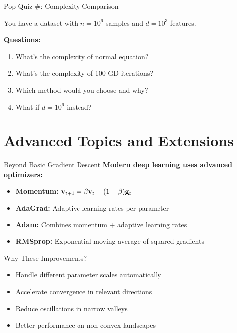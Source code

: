 \documentclass[usenames,dvipsnames]{beamer}
\begin{document}
  \begin{frame}{Pop Quiz \#\thepopquiz: Complexity Comparison}
    \begin{popquizbox}{\thepopquiz}
    You have a dataset with $n = 10^6$ samples and $d = 10^3$ features.
    
    \textbf{Questions:}
    \begin{enumerate}
        \item What's the complexity of normal equation?
        \item What's the complexity of 100 GD iterations?
        \item Which method would you choose and why?
        \item What if $d = 10^6$ instead?
    \end{enumerate}
    \end{popquizbox}
  \end{frame}

  \section{Advanced Topics and Extensions}

  \begin{frame}{Beyond Basic Gradient Descent}
    \textbf{Modern deep learning uses advanced optimizers:}
    
    \begin{itemize}[<+->]
        \item \textbf{Momentum:} $\mathbf{v}_{t+1} = \beta \mathbf{v}_t + (1-\beta)\mathbf{g}_t$
        \item \textbf{AdaGrad:} Adaptive learning rates per parameter
        \item \textbf{Adam:} Combines momentum + adaptive learning rates  
        \item \textbf{RMSprop:} Exponential moving average of squared gradients
    \end{itemize}
    
    \pause
    \begin{examplebox}{Why These Improvements?}
    \begin{itemize}
        \item Handle different parameter scales automatically
        \item Accelerate convergence in relevant directions
        \item Reduce oscillations in narrow valleys
        \item Better performance on non-convex landscapes
    \end{itemize}
    \end{examplebox}
  \end{frame}
\end{document}
